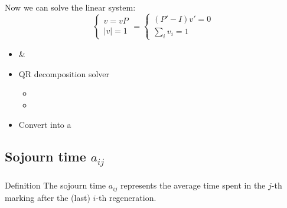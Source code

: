 \begin{frame}
  Now we can solve the linear system:
  \begin{equation*}
    \begin{cases}
      v=vP\\
      |v| = 1
    \end{cases}
    =
    \begin{cases}
      (P'-I)v'=0\\
      \sum_i v_i = 1
    \end{cases}
  \end{equation*}
  \begin{itemize}
  \item {} \& 
  \item QR decomposition solver
    \begin{itemize}\tiny
    \item {}
    \item {}
    \end{itemize}
  \item Convert  into a 
  \end{itemize}
\end{frame}

\subsection{Sojourn time $a_{ij}$}
\begin{frame}
  \frametitle{\insertsubsection}
  \begin{block}{Definition}
    The sojourn time \alert{$a_{ij}$} represents the average time spent in the
    \alert{$j$-th marking} after the (last) \alert{$i$-th regeneration}.
  \end{block}
\end{frame}

